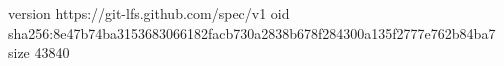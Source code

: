 version https://git-lfs.github.com/spec/v1
oid sha256:8e47b74ba3153683066182facb730a2838b678f284300a135f2777e762b84ba7
size 43840
